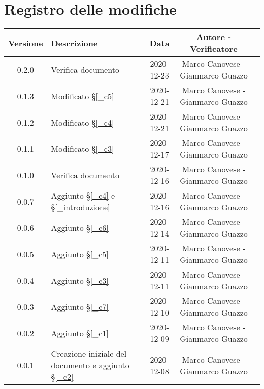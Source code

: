 \section*{Registro delle modifiche}

\begin{center}
	\begin{longtable}{|c|p{5cm}|c|c|c|}
	\hline
	\rowcolor{lighter-grayer}
	\textbf{Versione} & \textbf{Descrizione} & \textbf{Data} & \textbf{Autore - Verificatore}\\
	\hline
	\endfirsthead

	\hline
	0.2.0 & Verifica documento & 2020-12-23 & Marco Canovese - Gianmarco Guazzo\\
	0.1.3 & Modificato \S\ref{_c5} & 2020-12-21 & Marco Canovese - Gianmarco Guazzo\\
	0.1.2 & Modificato \S\ref{_c4} & 2020-12-21 & Marco Canovese - Gianmarco Guazzo\\
	0.1.1 & Modificato \S\ref{_c3} & 2020-12-17 & Marco Canovese - Gianmarco Guazzo\\
	0.1.0 & Verifica documento & 2020-12-16 & Marco Canovese - Gianmarco Guazzo\\
	0.0.7 & Aggiunto \S\ref{_c4} e \S\ref{_introduzione} & 2020-12-16 & Marco Canovese - Gianmarco Guazzo\\
	0.0.6 & Aggiunto \S\ref{_c6} & 2020-12-14 & Marco Canovese - Gianmarco Guazzo\\
	0.0.5 & Aggiunto \S\ref{_c5} & 2020-12-11 & Marco Canovese - Gianmarco Guazzo\\
	0.0.4 & Aggiunto \S\ref{_c3} & 2020-12-11 & Marco Canovese - Gianmarco Guazzo\\
	0.0.3 & Aggiunto \S\ref{_c7} & 2020-12-10 & Marco Canovese - Gianmarco Guazzo\\
	0.0.2 & Aggiunto \S\ref{_c1} & 2020-12-09 & Marco Canovese - Gianmarco Guazzo\\
    0.0.1 & Creazione iniziale del documento e aggiunto \S\ref{_c2} & 2020-12-08 & Marco Canovese - Gianmarco Guazzo\\
	\hline

	\end{longtable}
\end{center}
